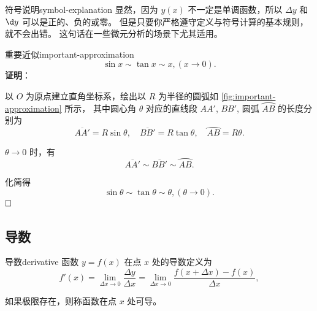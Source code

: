 \begin{note}{符号说明}{symbol-explanation}
    显然，因为 $ y(x) $ 不一定是单调函数，所以 $ \Delta y $ 和 $ \d y $ 可以是正的、负的或零。
    但是只要你严格遵守定义与符号计算的基本规则，就不会出错。
    这句话在一些微元分析的场景下尤其适用。
\end{note}

\begin{example}{重要近似}{important-approximation}
    \begin{equation}
        \sin x \sim \tan x \sim x, (x \to 0).
    \end{equation}
    \textbf{证明}：


    以 $ O $ 为原点建立直角坐标系，绘出以 $ R $ 为半径的圆弧如 \cref{fig:important-approximation} 所示，
    其中圆心角 $ \theta $ 对应的直线段 $ AA' $, $ BB' $, 圆弧 $ \overparen{AB} $ 的长度分别为
    \begin{equation*}
        \overline{AA'} = R \sin \theta, \quad \overline{BB'} = R \tan \theta, \quad \overparen{AB} = R \theta.
    \end{equation*}

    $\theta \to 0$ 时，有
    \begin{equation*}
        \overline{AA'} \sim \overline{BB'} \sim \overparen{AB} .
    \end{equation*}

    化简得
    \begin{equation*}
        \sin \theta \sim \tan \theta \sim \theta, (\theta \to 0).
    \end{equation*}
    $\hfill\square$
\end{example}

\subsection{导数}\label{subsec:derivative}

\begin{definition}{导数}{derivative}
    函数 $ y = f(x) $ 在点 $ x $ 处的导数定义为
    \begin{equation}
        f'(x) = \lim_{\Delta x \to 0} \frac{\Delta y}{\Delta x} = \lim_{\Delta x \to 0} \frac{f(x + \Delta x) - f(x)}{\Delta x},
    \end{equation}

    如果极限存在，则称函数在点 $ x $ 处可导。

\end{definition}

